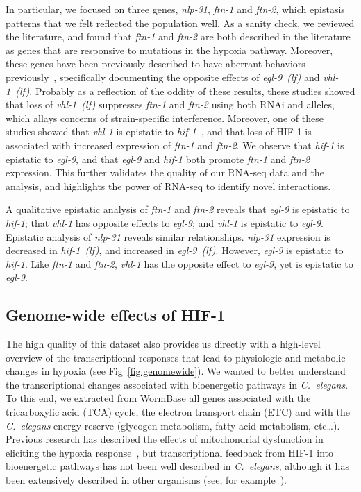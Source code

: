 \documentclass[9pt,twocolumn,twoside]{pnas-new}
\newcommand{\cel}{\emph{C.~elegans}}
\newcommand{\gene}[1]{\emph{#1}}
\newcommand{\nlp}{\emph{nlp-31}}
\newcommand{\ftna}{\emph{ftn-1}}
\newcommand{\ftnb}{\emph{ftn-2}}
\newcommand{\egl}{\emph{egl-9~(lf)}}
\newcommand{\vhl}{\emph{vhl-1~(lf)}}
\newcommand{\hif}{\emph{hif-1~(lf)}}
\newcommand{\hifp}{HIF-1}
\begin{document}
In particular, we focused on three genes, \nlp{}, \ftna{} and \ftnb{}, which
epistasis patterns that we felt reflected the population well. As a sanity check,
we reviewed the literature, and found that \ftna{} and \ftnb{} are both described
in the literature as genes that are responsive to mutations in the hypoxia pathway.
Moreover, these genes have been previously described to have aberrant behaviors
previously~\cite{Ackerman2012,Romney2011}, specifically documenting the opposite
effects of \egl{} and \vhl{}. Probably as a reflection of the oddity of these
results, these studies showed that loss of \vhl{} suppresses \ftna{} and \ftnb{}
using both RNAi and alleles, which allays concerns of strain-specific interference.
Moreover, one of these studies showed that \gene{vhl-1}
is epistatic to \gene{hif-1}~\cite{Ackerman2012}, and that loss of \hifp{} is
associated with increased expression of \ftna{} and \ftnb{}. We observe that
\gene{hif-1} is epistatic to \gene{egl-9}, and that \gene{egl-9} and \gene{hif-1}
both promote \ftna{} and \ftnb{} expression.
This further validates the quality of our RNA-seq data and the analysis, and
highlights the power of RNA-seq to identify novel interactions.

A qualitative epistatic analysis of \ftna{} and \ftnb{} reveals that \gene{egl-9} is
epistatic to \gene{hif-1}; that \gene{vhl-1} has opposite effects to \gene{egl-9};
and \gene{vhl-1} is epistatic to \gene{egl-9}. Epistatic analysis of \nlp{}
reveals similar relationships. \nlp{} expression is decreased in \hif{},
and increased in \egl{}. However, \gene{egl-9} is epistatic to \gene{hif-1}.
Like \ftna{} and \ftnb{},  \gene{vhl-1} has the opposite effect to \gene{egl-9},
yet is epistatic to \gene{egl-9}.

\subsection{Genome-wide effects of \hifp{}}
\label{sub:metabolism}

The high quality of this dataset also provides us directly with a high-level
overview of the transcriptional responses that lead to physiologic and metabolic
changes in hypoxia (see Fig~\ref{fig:genomewide}).
We wanted to better understand the transcriptional changes
associated with bioenergetic pathways in \cel{}. To this end, we extracted from
WormBase all genes associated with the tricarboxylic acid (TCA) cycle, the
electron transport chain (ETC) and with the \cel{} energy reserve (glycogen
metabolism, fatty acid metabolism, etc\ldots). Previous research has described
the effects of mitochondrial dysfunction in eliciting the hypoxia
response~\cite{Lee2010}, but transcriptional feedback from \hifp{} into
bioenergetic pathways has not been well described in \cel{}, although it has been
extensively described in other organisms (see, for example~\cite{Semenza1994,
Semenza2012}).
\end{document}
